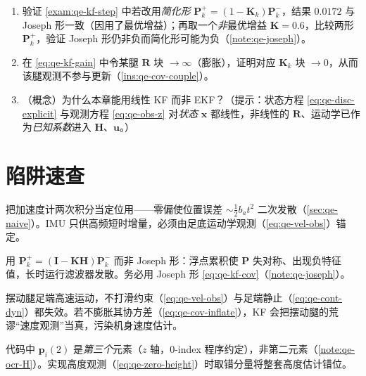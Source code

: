 \begin{practice}
\begin{enumerate}
  \item 验证 \cref{exam:qe-kf-step} 中若改用\emph{简化形} $\mathbf{P}_k^+=(1-\mathbf{K}_k)\mathbf{P}_k^-$，结果 $0.0172$ 与 Joseph 形一致（因用了最优增益）；再取一个\emph{非}最优增益 $\mathbf{K}=0.6$，比较两形 $\mathbf{P}_k^+$，验证 Joseph 形仍非负而简化形可能为负（\cref{note:qe-joseph}）。
  \item 在 \cref{eq:qe-kf-gain} 中令某腿 $\mathbf{R}$ 块 $\to\infty$（膨胀），证明对应 $\mathbf{K}_k$ 块 $\to0$，从而该腿观测不参与更新（\cref{ins:qe-cov-couple}）。
  \item （概念）为什么本章能用线性 KF 而非 EKF？（提示：状态方程 \cref{eq:qe-disc-explicit} 与观测方程 \cref{eq:qe-obs-z} 对\emph{状态} $\boldsymbol x$ 都线性，非线性的 $\mathbf{R}$、运动学已作为\emph{已知系数}进入 $\mathbf{H}$、$\boldsymbol u$。）
\end{enumerate}
\end{practice}

\section{陷阱速查}
\label{sec:qe-pitfall}

\begin{pitfall}
把加速度计两次积分当定位用——零偏使位置误差 $\sim\tfrac12 b_a t^2$ 二次发散（\cref{sec:qe-naive}）。IMU 只供高频短时增量，必须由足底运动学观测（\cref{eq:qe-vel-obs}）锚定。
\end{pitfall}

\begin{pitfall}[简化形协方差更新长时发散]
用 $\mathbf{P}_k^+=(\mathbf{I}-\mathbf{K}\mathbf{H})\mathbf{P}_k^-$ 而非 Joseph 形：浮点累积使 $\mathbf{P}$ 失对称、出现负特征值，长时运行滤波器发散。务必用 Joseph 形 \cref{eq:qe-kf-cov}（\cref{note:qe-joseph}）。
\end{pitfall}

\begin{pitfall}[忘记给摆动腿膨胀协方差]
摆动腿足端高速运动，不打滑约束（\cref{eq:qe-vel-obs}）与足端静止（\cref{eq:qe-cont-dyn}）都失效。若不膨胀其协方差（\cref{eq:qe-cov-inflate}），KF 会把摆动腿的荒谬“速度观测”当真，污染机身速度估计。
\end{pitfall}

\begin{pitfall}
代码中 $\boldsymbol p_i(2)$ 是\emph{第三个}元素（$z$ 轴，$0$-index 程序约定），非第二元素（\cref{note:qe-ocr-H}）。实现高度观测（\cref{eq:qe-zero-height}）时取错分量将整套高度估计错位。
\end{pitfall}

